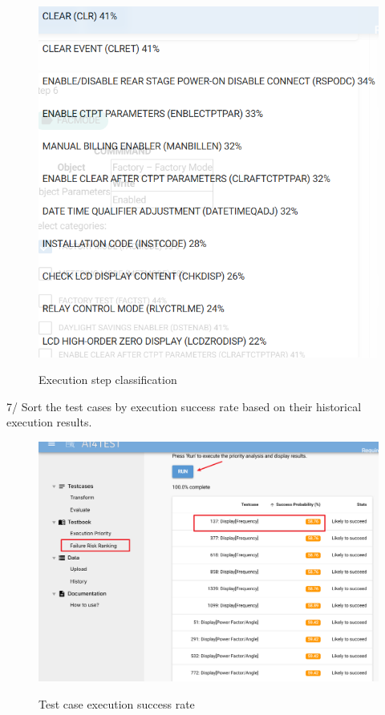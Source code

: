 \begin{figure}[H]
    \begin{center}
        \includegraphics[width=.95\linewidth]{res/ai4test-category.png}\\
        \caption{Execution step classification}\label{ai4test-category}
    \end{center}
\end{figure}

7/  Sort the test cases by execution success rate based on their historical execution results.

\begin{figure}[H]
    \begin{center}
        \includegraphics[width=.95\linewidth]{res/ai4test-priority.png}\\
        \caption{Test case execution success rate }\label{ai4test-priority}
    \end{center}
\end{figure}

